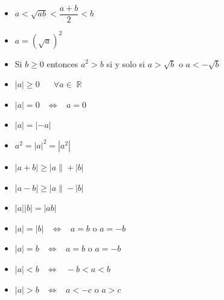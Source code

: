 \documentclass[12pt, fleqn]{report}                             %
\DeclareMathOperator \Space     {\quad}                         %
\DeclareMathOperator \MiniSpace {\;}                            %
\theoremstyle{break}                                            %
\newcommand \lEqual  {\MiniSpace \Leftrightarrow \MiniSpace}    %
\DeclareMathOperator \Reals        {\mathbb{R}}                 %
\begin{document}
            \begin{itemize}

                    \item $a < \sqrt{ab} < \dfrac{a+b}{2} < b$

                    \item $a = (\sqrt{a})^2$

                    \item Si $b \geq 0$ entonces $a^2 > b$ si y solo si $a>\sqrt{b}$ o $a<-\sqrt{b}$

                    \item $|a| \geq 0 \Space \forall a \in \Reals$

                    \item $|a| = 0 \lEqual a = 0$
                    
                    \item $|a| = |-a|$
                    
                    \item $a^2 = |a|^2 = |a^2|$
                    
                    \item $|a+b| \geq |a\| + |b|$
                    
                    \item $|a-b| \geq |a\| - |b|$
                    
                    \item $|a||b| = |ab|$

                    \item $|a| = |b| \lEqual a = b$ o $a = -b$

                    \item $|a| = b \lEqual a = b$ o $a = -b$

                    \item $|a| < b \lEqual -b < a < b$
                    \item $|a| > b \lEqual a < -c $ o $a > c$

            \end{itemize}

        
\end{document}
